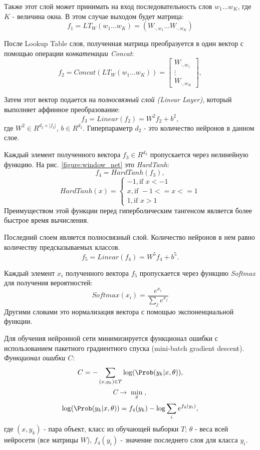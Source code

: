   Также этот слой может принимать на вход последовательность слов $w_1 \ldots w_K$,
  где $K$ - величина окна. В этом случае выходом будет матрица:
  \[
    f_1 = LT_W(w_1 \ldots w_K) = ( W_{\cdot, w_1} \ldots W_{\cdot, w_K})
  \]

  После Lookup Table слоя, полученная матрица преобразуется в один вектор с
  помощью операции \textit{конкатенации Concat}:
  \[
    f_{2} = Concat(LT_W(w_1 \ldots w_K)) =
      \begin{bmatrix}
        W_{\cdot, w_1} \\
        \vdots \\
        W_{\cdot, w_K}
      \end{bmatrix},
  \]

  Затем этот вектор подается на \textit{полносвязный слой (Linear Layer)}, который
  выполняет аффинное преобразование:
  \begin{equation} \label{formula:linear_layer}
    f_{3} = Linear(f_{2}) = W^2 f_{2} + b^2,
  \end{equation}
  где $W^2 \in R^{d_{2} \times |f_{2}|}$, $b \in R^{d_2}$. Гиперпараметр $d_{2}$ -
  это количество нейронов в данном слое.

  Каждый элемент полученного вектора $f_3 \in R^{d_2}$ пропускается через нелинейную функцию.
  На рис. \ref{figure:window_net} это \textit{HardTanh}:
  \[
    f_{4} = HardTanh(f_{3}),
  \]
  \begin{equation} \label{formula:hard_tanh}
  HardTanh(x) =
    \begin{cases}
      -1, \text{if } x < -1 \\
      x, \text{if } -1 <= x <= 1 \\
      1, \text{if } x > 1
    \end{cases}
  \end{equation}
  Преимуществом этой функции перед гиперболическим тангенсом является более быстрое
  время вычисления.

  Последний слоем является полносвязный слой. Количество нейронов в нем
  равно количеству предсказываемых классов.
  \[
    f_5 = Linear(f_4) = W^5 f_{4} + b^5.
  \]

  Каждый элемент $x_i$ полученного вектора $f_5$ пропускается через функцию \textit{Softmax} для получения
  вероятностей:
  \[
    Softmax(x_{i}) = \frac{e^{x_{i}}}{\sum_j e^{x_{j}}}
  \]
  Другими словами это нормализация вектора с помощью экспоненциальной функции.

  Для обучения нейронной сети минимизируется функционал ошибки с использованием
  пакетного градиентного спуска (mini-batch gradient descent).
  \textit{Функционал ошибки $C$}:
  \[
    C = - \sum_{(x, y_k) \in T} \log(\Prob(y_k | x, \theta)),
  \]
  \[
    C \rightarrow \min_\theta,
  \]
  \[
    \log(\Prob(y_k | x, \theta)) = f_4(y_k) - \log\sum_i e^{f_4(y_i)},
  \]
  где $(x, y_k)$ - пара объект, класс из обучающей выборки $T$; $\theta$ - веса
  всей нейросети (все матрицы $W$), $f_4(y_i)$ - значение последнего слоя для класса $y_i$.

